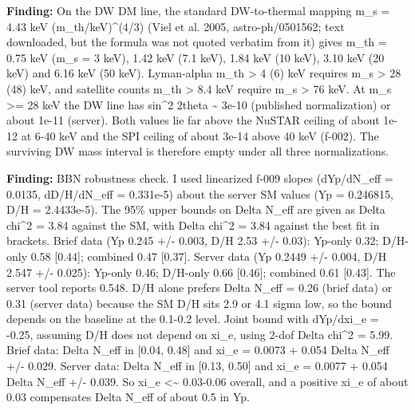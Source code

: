 \documentclass[11pt,a4paper]{article}
\begin{document}
\textbf{Finding:} On the DW DM line, the standard DW-to-thermal mapping m\_s = 4.43 keV (m\_th/keV)\textasciicircum{}(4/3) (Viel et al. 2005, astro-ph/0501562; text downloaded, but the formula was not quoted verbatim from it) gives m\_th = 0.75 keV (m\_s = 3 keV), 1.42 keV (7.1 keV), 1.84 keV (10 keV), 3.10 keV (20 keV) and 6.16 keV (50 keV). Lyman-alpha m\_th \textgreater{} 4 (6) keV requires m\_s \textgreater{} 28 (48) keV, and satellite counts m\_th \textgreater{} 8.4 keV require m\_s \textgreater{} 76 keV. At m\_s \textgreater{}= 28 keV the DW line has sin\textasciicircum{}2 2theta \textasciitilde{} 3e-10 (published normalization) or about 1e-11 (server). Both values lie far above the NuSTAR ceiling of about 1e-12 at 6-40 keV and the SPI ceiling of about 3e-14 above 40 keV (f-002). The surviving DW mass interval is therefore empty under all three normalizations.

\textbf{Finding:} BBN robustness check. I used linearized f-009 slopes (dYp/dN\_eff = 0.0135, dD/H/dN\_eff = 0.331e-5) about the server SM values (Yp = 0.246815, D/H = 2.4433e-5). The 95\% upper bounds on Delta N\_eff are given as Delta chi\textasciicircum{}2 = 3.84 against the SM, with Delta chi\textasciicircum{}2 = 3.84 against the best fit in brackets. Brief data (Yp 0.245 +/- 0.003, D/H 2.53 +/- 0.03): Yp-only 0.32; D/H-only 0.58 [0.44]; combined 0.47 [0.37]. Server data (Yp 0.2449 +/- 0.004, D/H 2.547 +/- 0.025): Yp-only 0.46; D/H-only 0.66 [0.46]; combined 0.61 [0.43]. The server tool reports 0.548. D/H alone prefers Delta N\_eff = 0.26 (brief data) or 0.31 (server data) because the SM D/H sits 2.9 or 4.1 sigma low, so the bound depends on the baseline at the 0.1-0.2 level. Joint bound with dYp/dxi\_e = -0.25, assuming D/H does not depend on xi\_e, using 2-dof Delta chi\textasciicircum{}2 = 5.99. Brief data: Delta N\_eff in [0.04, 0.48] and xi\_e = 0.0073 + 0.054 Delta N\_eff +/- 0.029. Server data: Delta N\_eff in [0.13, 0.50] and xi\_e = 0.0077 + 0.054 Delta N\_eff +/- 0.039. So \textbar{}xi\_e\textbar{} \textless{}\textasciitilde{} 0.03-0.06 overall, and a positive xi\_e of about 0.03 compensates Delta N\_eff of about 0.5 in Yp.
\end{document}
